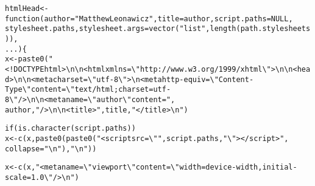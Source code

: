 \documentclass{article}\usepackage[]{graphicx}\usepackage[]{color}
\makeatletter
\newcommand{\hlstr}[1]{\textcolor[rgb]{0.863,0.196,0.184}{#1}}%
\newcommand{\hlstd}[1]{\textcolor[rgb]{0.514,0.58,0.588}{#1}}%
\newcommand{\hlkwa}[1]{\textcolor[rgb]{0.796,0.294,0.086}{#1}}%
\newcommand{\hlkwb}[1]{\textcolor[rgb]{0.522,0.6,0}{#1}}%
\newcommand{\hlkwc}[1]{\textcolor[rgb]{0.796,0.294,0.086}{#1}}%
\newcommand{\hlkwd}[1]{\textcolor[rgb]{0.576,0.631,0.631}{#1}}%
\newenvironment{kframe}{%
 \def\at@end@of@kframe{}%
 \ifinner\ifhmode%
  \def\at@end@of@kframe{\end{minipage}}%
  \begin{minipage}{\columnwidth}%
 \fi\fi%
 \def\FrameCommand##1{\hskip\@totalleftmargin \hskip-\fboxsep
 \colorbox{shadecolor}{##1}\hskip-\fboxsep
     \hskip-\linewidth \hskip-\@totalleftmargin \hskip\columnwidth}%
 \MakeFramed {\advance\hsize-\width
   \@totalleftmargin\z@ \linewidth\hsize
   \@setminipage}}%
 {\par\unskip\endMakeFramed%
 \at@end@of@kframe}
\newenvironment{knitrout}{}{} %
\makeatother
\begin{document}
\begin{knitrout}
\color{fgcolor}\begin{kframe}
\begin{alltt}
\hlstd{htmlHead} \hlkwb{<-} \hlkwa{function}\hlstd{(}\hlkwc{author} \hlstd{=} \hlstr{"Matthew Leonawicz"}\hlstd{,} \hlkwc{title} \hlstd{= author,} \hlkwc{script.paths} \hlstd{=} \hlkwa{NULL}\hlstd{,}
    \hlkwc{stylesheet.paths}\hlstd{,} \hlkwc{stylesheet.args} \hlstd{=} \hlkwd{vector}\hlstd{(}\hlstr{"list"}\hlstd{,} \hlkwd{length}\hlstd{(path.stylesheets)),}
    \hlkwc{...}\hlstd{) \{}
    \hlstd{x} \hlkwb{<-} \hlkwd{paste0}\hlstd{(}\hlstr{"<!DOCTYPE html>\textbackslash{}n\textbackslash{}n<html xmlns=\textbackslash{}"http://www.w3.org/1999/xhtml\textbackslash{}">\textbackslash{}n\textbackslash{}n<head>\textbackslash{}n\textbackslash{}n<meta charset=\textbackslash{}"utf-8\textbackslash{}">\textbackslash{}n<meta http-equiv=\textbackslash{}"Content-Type\textbackslash{}" content=\textbackslash{}"text/html; charset=utf-8\textbackslash{}" />\textbackslash{}n\textbackslash{}n<meta name=\textbackslash{}"author\textbackslash{}" content="}\hlstd{,}
        \hlstd{author,} \hlstr{" />\textbackslash{}n\textbackslash{}n<title>"}\hlstd{, title,} \hlstr{"</title>\textbackslash{}n"}\hlstd{)}

    \hlkwa{if} \hlstd{(}\hlkwd{is.character}\hlstd{(script.paths))}
        \hlstd{x} \hlkwb{<-} \hlkwd{c}\hlstd{(x,} \hlkwd{paste0}\hlstd{(}\hlkwd{paste0}\hlstd{(}\hlstr{"<script src=\textbackslash{}""}\hlstd{, script.paths,} \hlstr{"\textbackslash{}"></script>"}\hlstd{,}
            \hlkwc{collapse} \hlstd{=} \hlstr{"\textbackslash{}n"}\hlstd{),} \hlstr{"\textbackslash{}n"}\hlstd{))}

    \hlstd{x} \hlkwb{<-} \hlkwd{c}\hlstd{(x,} \hlstr{"<meta name=\textbackslash{}"viewport\textbackslash{}" content=\textbackslash{}"width=device-width, initial-scale=1.0\textbackslash{}" />\textbackslash{}n"}\hlstd{)}


\end{alltt}
\end{kframe}
\end{knitrout}
\end{document}
